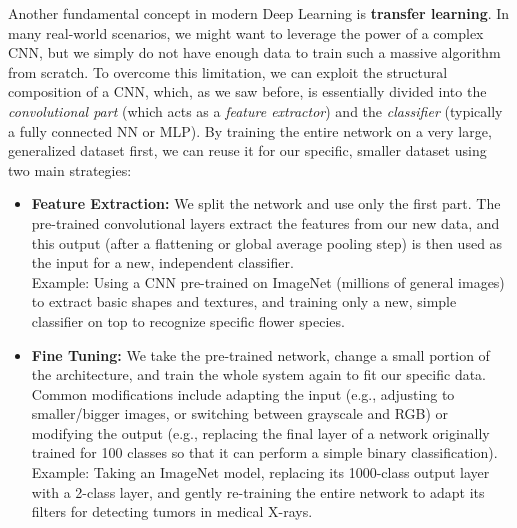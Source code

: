 Another fundamental concept in modern Deep Learning is \textbf{transfer learning}. In many real-world scenarios, we might want to leverage the power of a complex CNN, but we simply do not have enough data to train such a massive algorithm from scratch. To overcome this limitation, we can exploit the structural composition of a CNN, which, as we saw before, is essentially divided into the \textit{convolutional part} (which acts as a \textit{feature extractor}) and the \textit{classifier} (typically a fully connected NN or MLP). By training the entire network on a very large, generalized dataset first, we can reuse it for our specific, smaller dataset using two main strategies:
\begin{itemize}
    \item[-] \textbf{Feature Extraction:} We split the network and use only the first part. The pre-trained convolutional layers extract the features from our new data, and this output (after a flattening or global average pooling step) is then used as the input for a new, independent classifier. \\ Example: Using a CNN pre-trained on ImageNet (millions of general images) to extract basic shapes and textures, and training only a new, simple classifier on top to recognize specific flower species.
    \item[-] \textbf{Fine Tuning:} We take the pre-trained network, change a small portion of the architecture, and train the whole system again to fit our specific data. Common modifications include adapting the input (e.g., adjusting to smaller/bigger images, or switching between grayscale and RGB) or modifying the output (e.g., replacing the final layer of a network originally trained for 100 classes so that it can perform a simple binary classification). \\ Example: Taking an ImageNet model, replacing its 1000-class output layer with a 2-class layer, and gently re-training the entire network to adapt its filters for detecting tumors in medical X-rays.
\end{itemize}